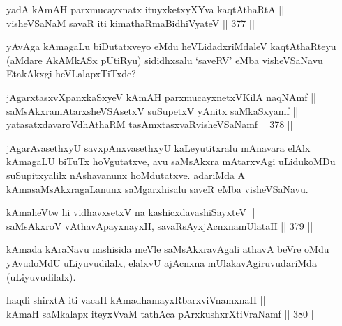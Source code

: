 
\begin{shl}
yadA kAmAH parxmucayxnatx ituyxketxyXYva kaqtAthaRtA || \\
visheVSaNaM savaR iti kimathaRmaBidhiVyateV \hfill || 377 ||  
\end{shl}

\begin{artha}
yAvAga kAmagaLu biDutatxveyo eMdu heVLidadxriMdaleV kaqtAthaRteyu
(aMdare AkAMkASx pUtiRyu) sididhxsalu `saveRV' eMba visheVSaNavu EtakAkxgi heVLalapxTiTxde?
\end{artha}


\begin{shl}
jAgarxtasxvXpanxkaSxyeV kAmAH parxmucayxnetxV\s KilA naqNAmf || \\
saMsAkxramAtarxsheVSAsetxV suSupetxV yAnitx saMkaSxyamf || \\
yatasatxdavaroVdhAthaRM tasAmxtasxvaRvisheVSaNamf \hfill || 378 ||  
\end{shl}

\begin{artha}
jAgarAvasethxyU savxpAnxvasethxyU kaLeyutitxralu mAnavara elAlx
kAmagaLU biTuTx hoVgutatxve, avu saMsAkxra mAtarxvAgi uLidukoMDu
suSupitxyalilx nAshavanunx hoMdutatxve. adariMda A
kAmasaMsAkxragaLanunx saMgarxhisalu saveR eMba visheVSaNavu.
\end{artha}


\begin{shl}
kAmaheVtw hi vidhavxsetxV na kashicxdavashiSayxteV || \\
saMsAkxroV vA\s thavA\s payxnayxH, savaRsAyxjAcnxnamUlataH \hfill || 379 ||  
\end{shl}

\begin{artha}
kAmada kAraNavu nashisida meVle saMsAkxravAgali athavA beVre oMdu
yAvudoMdU uLiyuvudilalx, elalxvU ajAcnxna mUlakavAgiruvudariMda
(uLiyuvudilalx).
\end{artha}


\begin{shl}
haqdi shirxtA iti vacaH kAmadhamayxRbarxviVnamxnaH || \\
kAmaH saMkalapx iteyxVvaM tathAca pArxkushxrXtiVraNamf \hfill || 380 ||  
\end{shl}

